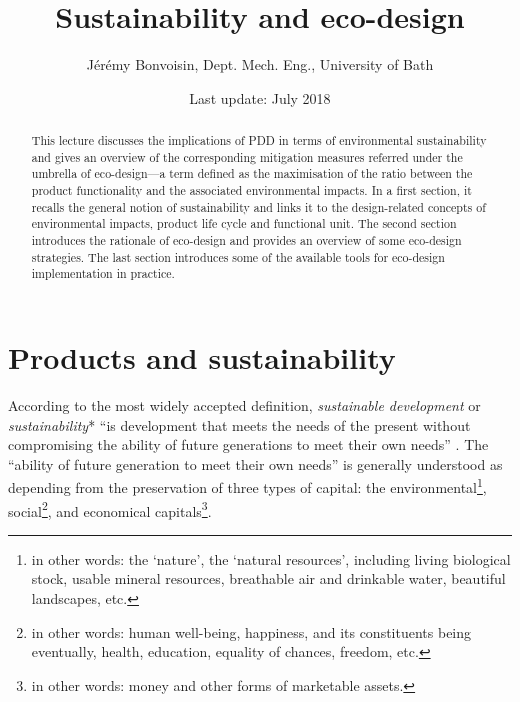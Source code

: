 \documentclass{article}
\newcommand{\subtitle}[1]{%
  \posttitle{%
    \par\end{center}
    \begin{center}\large#1\end{center}
    \vskip0.5em}%
}
\begin{document}
\title{Sustainability and eco-design}
\author{Jérémy Bonvoisin, Dept. Mech. Eng., University of Bath}
\date{Last update: July 2018}

\maketitle

\begin{abstract}
This lecture discusses the implications of PDD in terms of environmental sustainability and gives an overview of the corresponding mitigation measures referred under the umbrella of eco-design---a term defined as the maximisation of the ratio between the product functionality and the associated environmental impacts. In a first section, it recalls the general notion of sustainability and links it to the design-related concepts of environmental impacts, product life cycle and functional unit. The second section introduces the rationale of eco-design and provides an overview of some eco-design strategies. The last section introduces some of the available tools for eco-design implementation in practice. 
\end{abstract}

\section{Products and sustainability}
\label{sec:sustainability}

According to the most widely accepted definition, \emph{sustainable development} or \emph{sustainability}* ``is development that meets the needs of the present without compromising the ability of future generations to meet their own needs'' \cite{brundtland1987our}. The ``ability of future generation to meet their own needs'' is generally understood as depending from the preservation of three types of capital: the environmental\footnote{in other words: the `nature', the `natural resources', including living biological stock, usable mineral resources, breathable air and drinkable water, beautiful landscapes, etc.}, social\footnote{in other words: human well-being, happiness, and its constituents being eventually, health, education, equality of chances, freedom, etc.}, and economical capitals\footnote{in other words: money and other forms of marketable assets.}. 
\end{document}
